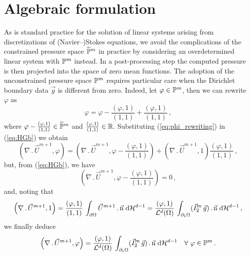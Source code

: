 \section{Algebraic formulation}\label{sec:stokes_algebraic_system}
As is standard practice for the solution of linear systems arising from
discretizations of (Navier--)Stokes equations, we avoid the complications of the
constrained pressure space $\widetilde{\mathbb{P}}^m$ in practice by considering an
overdetermined linear system with $\mathbb{P}^m$ instead. In a post-processing step
the computed pressure is then projected into the space of zero mean
functions. The adoption of the unconstrained pressure space $\mathbb{P}^m$
requires particular care when the Dirichlet boundary data $\vec g$ is different
from zero. Indeed, let $\varphi \in \mathbb{P}^m$, then we can rewrite $\varphi$ as
\begin{equation}\label{eq:phi_rewriting}
\varphi=\varphi-\frac{\left(\varphi,1\right)}{\left(1,1\right)}
+\frac{\left(\varphi,1\right)}{\left(1,1\right)}\,,
\end{equation}
where $\varphi-\frac{(\varphi,1)}{(1,1)}\in\widetilde{\mathbb{P}}^m$ and
$\frac{(\varphi,1)}{(1,1)}\in\mathbb R$. Substituting (\ref{eq:phi_rewriting}) in
(\ref{eq:HGb}) we obtain
\begin{equation}
\left(\nabla\,.\,\vec U^{m+1}, \varphi\right)  =
\left(\nabla\,.\,\vec U^{m+1},
\varphi-\frac{\left(\varphi,1\right)}{\left(1,1\right)}\right) +
\left(\nabla\,.\,\vec U^{m+1},1\right)
\frac{\left(\varphi,1\right)}{\left(1,1\right)}\,,
\end{equation}
but, from (\ref{eq:HGb}), we have
\begin{equation}
\left(\nabla\,.\,\vec U^{m+1},
\varphi-\frac{\left(\varphi,1\right)}{\left(1,1\right)}\right) = 0\,,
\end{equation}
and, noting that
\begin{equation}\label{eq:div_to_line_integral}
\left(\nabla\,.\,\vec U^{m+1}, 1\right)=
\frac{\left(\varphi,1\right)}{\left(1,1\right)}\, \int_{\partial\Omega}
\vec U^{m+1}\,.\, \vec{\rm n} \;{\rm d}{\cal H}^{d-1}=
\frac{\left(\varphi,1\right)}{\mathcal{L}^d(\Omega)}\, \int_{\partial_1\Omega}
(\vec I^m_2\,\vec g) \,.\, \vec{\rm n} \;{\rm d}{\cal H}^{d-1}\,,
\end{equation}
we finally deduce
\begin{equation} \label{eq:LAb}
 \left(\nabla\,.\,\vec U^{m+1}, \varphi\right) =
 \frac{\left(\varphi, 1\right)}{\mathcal{L}^d(\Omega)}\, \int_{\partial_1\Omega}
(\vec I^m_2\,\vec g) \,.\, \vec{\rm n} \;{\rm d}{\cal H}^{d-1} \quad \forall\ \varphi \in
\mathbb{P}^m\,.
\end{equation}
